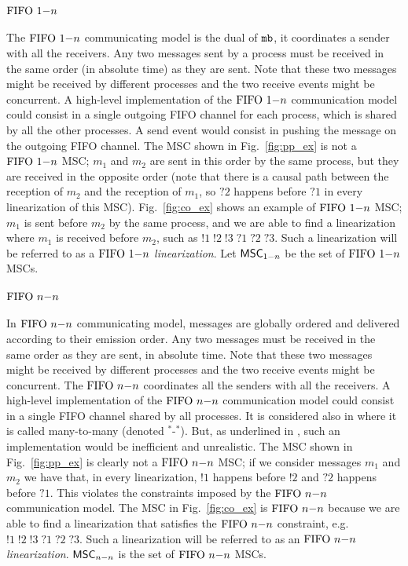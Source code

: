 \paragraph{\bf $\text{FIFO } 1\mathsf{-}n$}
The $\text{FIFO } 1\mathsf{-}n$ communicating model is the dual of $\mathtt{mb}$, it coordinates a sender with all the receivers. Any two messages sent by a process  must be received in the same order (in absolute time) as they are sent. Note that these two messages might be received by different processes and the two receive events might be concurrent.
A high-level implementation of the $\text{FIFO } 1\mathsf{-}n$ communication model could consist in a single outgoing FIFO channel for each process, which is shared by all the other processes. A send event would consist in pushing the message on the outgoing FIFO channel.
The MSC shown in Fig.~\ref{fig:pp_ex} is not a $\text{FIFO } 1\mathsf{-}n$ MSC; $m_1$ and $m_2$ are sent in this order by the same process, but they are received in the opposite order (note that there is a causal path between the reception of $m_2$ and the reception of $m_1$, so $?2$ happens before $?1$ in every linearization of this MSC). Fig.~\ref{fig:co_ex} shows an example of $\text{FIFO } 1\mathsf{-}n$ MSC; $m_1$ is sent before $m_2$ by the same process, and we are able to find a linearization where $m_1$ is received before $m_2$, such as $!1\;!2\;!3\;?1\;?2\;?3$. Such a linearization will be referred to as a \emph{$\text{FIFO } 1\mathsf{-}n$ linearization}. Let $\mathsf{MSC}_{1\mathsf{-}n}$ be the set of $\text{FIFO } 1\mathsf{-}n$ MSCs.

\paragraph{\bf $\text{FIFO } n\mathsf{-}n$}
In  $\text{FIFO } n\mathsf{-}n$ communicating model, messages are globally ordered and delivered according to  their emission order. Any two messages must be received in the same order as they are sent, in absolute time. Note that these two messages might be received by different processes and the two receive events might be concurrent. 
The $\text{FIFO } n\mathsf{-}n$ coordinates all the senders with all the receivers. A high-level implementation of the $\text{FIFO } n\mathsf{-}n$ communication model could consist in a single FIFO channel shared by all processes. It is considered also in \cite{DBLP:journals/tcs/BasuB16} where it is called  many-to-many (denoted $^\ast$-$^\ast$). But, as underlined in \cite{DBLP:journals/fac/ChevrouHQ16}, such an implementation would be inefficient and unrealistic.
 The MSC shown in Fig.~\ref{fig:pp_ex} is clearly not a $\text{FIFO } n\mathsf{-}n$ MSC; if we consider messages $m_1$ and $m_2$ we have that, in every linearization, $!1$ happens before $!2$ and $?2$ happens before $?1$. This violates the constraints imposed by the $\text{FIFO } n\mathsf{-}n$ communication model. The MSC in Fig.~\ref{fig:co_ex} is $\text{FIFO } n\mathsf{-}n$ because we are able to find a linearization that satisfies the $\text{FIFO } n\mathsf{-}n$ constraint, e.g. $!1\;!2\;!3\;?1\;?2\;?3$. Such a linearization will be referred to as an \emph{$\text{FIFO } n\mathsf{-}n$ linearization}.  $\mathsf{MSC}_{n\mathsf{-}n}$ is the set of $\text{FIFO } n\mathsf{-}n$ MSCs.

